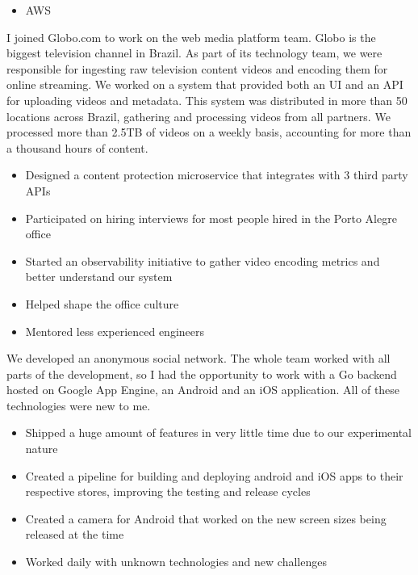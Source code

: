 \documentclass[10pt,a4paper,ragged2e,withhyper]{altacv}
\begin{document}
\begin{paracol}{2}
{\begin{itemize}
\item AWS
\end{itemize}
}

\divider


{\RaggedRight
I joined Globo.com to work on the web media platform team. Globo is the biggest television channel in Brazil. As part of its technology team, we were responsible for ingesting raw television content videos and encoding them for online streaming. We worked on a system that provided both an UI and an API for uploading videos and metadata. This system was distributed in more than 50 locations across Brazil, gathering and processing videos from all partners. We processed more than 2.5TB of videos on a weekly basis, accounting for more than a thousand hours of content.

\begin{itemize}
\item Designed a content protection microservice that integrates with 3 third party APIs
\item Participated on hiring interviews for most people hired in the Porto Alegre office
\item Started an observability initiative to gather video encoding metrics and better understand our system
\item Helped shape the office culture
\item Mentored less experienced engineers
\end{itemize}
}

\divider


{\RaggedRight
We developed an anonymous social network. The whole team worked with all parts of the development, so I had the opportunity to work with a Go backend hosted on Google App Engine, an Android and an iOS application. All of these technologies were new to me.

\begin{itemize}
\item Shipped a huge amount of features in very little time due to our experimental nature
\item Created a pipeline for building and deploying android and iOS apps to their respective stores, improving the testing and release cycles
\item Created a camera for Android that worked on the new screen sizes being released at the time
\item Worked daily with unknown technologies and new challenges
\end{itemize}
}


\end{paracol}
\end{document}
